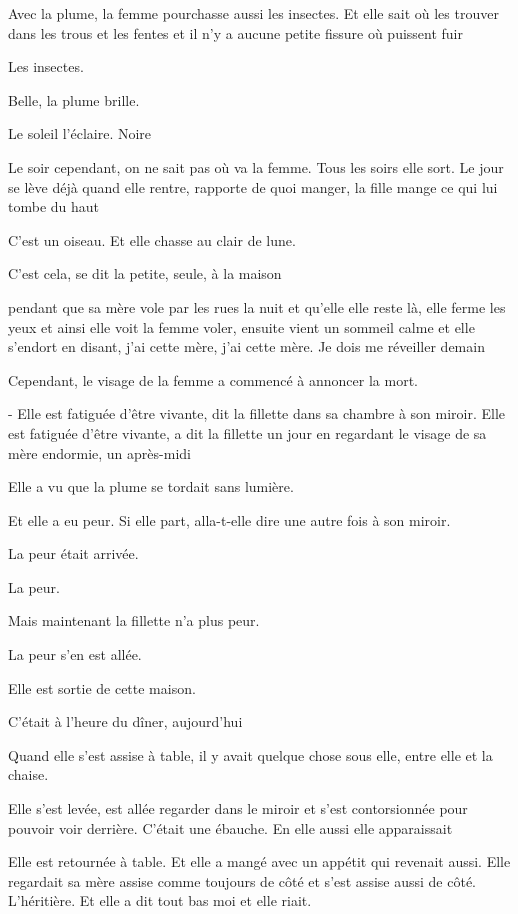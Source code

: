 Avec la plume, la femme pourchasse aussi les insectes. Et elle sait où
les trouver dans les trous et les fentes et il n'y a aucune petite
fissure où puissent fuir

Les insectes.

Belle, la plume brille.

Le soleil l'éclaire. Noire

Le soir cependant, on ne sait pas où va la femme. Tous les soirs elle
sort. Le jour se lève déjà quand elle rentre, rapporte de quoi manger,
la fille mange ce qui lui tombe du haut

C'est un oiseau. Et elle chasse au clair de lune.

C'est cela, se dit la petite, seule, à la maison

pendant que sa mère vole par les rues la nuit et qu'elle elle reste là,
elle ferme les yeux et ainsi elle voit la femme voler, ensuite vient un
sommeil calme et elle s'endort en disant, j'ai cette mère, j'ai cette
mère. Je dois me réveiller demain

Cependant, le visage de la femme a commencé à annoncer la mort.

- Elle est fatiguée d'être vivante, dit la fillette dans sa chambre à
son miroir. Elle est fatiguée d'être vivante, a dit la fillette un jour
en regardant le visage de sa mère endormie, un après-midi

Elle a vu que la plume se tordait sans lumière.

Et elle a eu peur. Si elle part, alla-t-elle dire une autre fois à son
miroir.

La peur était arrivée.

La peur.

Mais maintenant la fillette n'a plus peur.

La peur s'en est allée.

Elle est sortie de cette maison.

C'était à l'heure du dîner, aujourd'hui

Quand elle s'est assise à table, il y avait quelque chose sous elle,
entre elle et la chaise.

Elle s'est levée, est allée regarder dans le miroir et s'est
contorsionnée pour pouvoir voir derrière. C'était une ébauche. En elle
aussi elle apparaissait

Elle est retournée à table. Et elle a mangé avec un appétit qui revenait
aussi. Elle regardait sa mère assise comme toujours de côté et s'est
assise aussi de côté. L'héritière. Et elle a dit tout bas moi et elle
riait.

